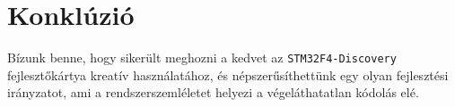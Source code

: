 \section{Konklúzió}

Bízunk benne, hogy sikerült meghozni a kedvet az \verb!STM32F4-Discovery! fejlesztőkártya kreatív használatához, és népszerűsíthettünk egy olyan fejlesztési irányzatot, ami a rendszerszemléletet helyezi a végeláthatatlan kódolás elé.


